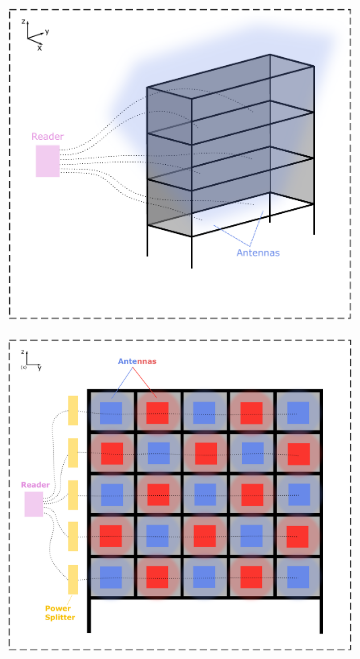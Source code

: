\begin{figure}[H]
    \centering
    \begin{subfigure}{.45\textwidth}
        \centering
        \includegraphics[width=\linewidth]{./figs/02-state-of-the-art/position2_1.pdf}
        \caption{} 
        \label{fig:position21}
    \end{subfigure}
    \begin{subfigure}{.45\textwidth}
        \centering
        \includegraphics[width=\linewidth]{./figs/02-state-of-the-art/position2_2.pdf}
        \caption{} 
        \label{fig:position22}
    \end{subfigure}
    \caption{} 
    \label{fig:position2}
\end{figure}

